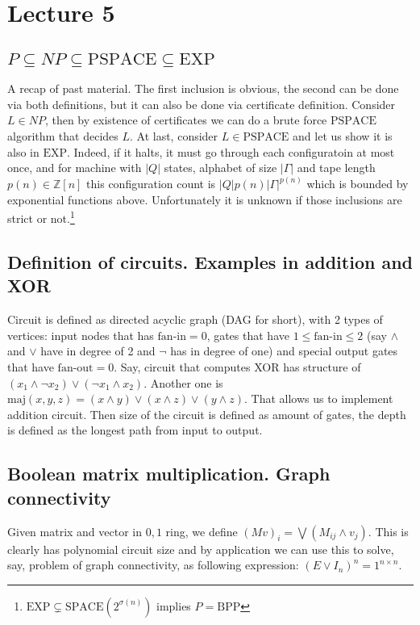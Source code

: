\documentclass[12pt]{article}
\begin{document}
\section{Lecture 5}
\subsection{\(P\subseteq NP\subseteq \text{PSPACE}\subseteq \text{EXP}\)}
A recap of past material. The first inclusion is obvious, the second can be done via both definitions, but it can also be done via certificate definition. Consider \(L\in NP\), then by existence of certificates we can do a brute force \(\text{PSPACE}\) algorithm that decides \(L\). At last, consider \(L\in\text{PSPACE}\) and let us show it is also in \(\text{EXP}\). Indeed, if it halts, it must go through each configuratoin at most once, and for machine with \(|Q|\) states, alphabet of size \(|\Gamma|\) and tape length \(p(n)\in\mathbb Z[n]\) this configuration count is \(|Q| p(n) |\Gamma|^{p(n)}\) which is bounded by exponential functions above. Unfortunately it is unknown if those inclusions are strict or not.\footnote{\(\text{EXP}\subsetneq \text{SPACE}(2^{\sigma(n)})\) implies \(P=\text{BPP}\)} 
\subsection{Definition of circuits. Examples in addition and XOR}
Circuit is defined as directed acyclic graph (DAG for short), with 2 types of vertices: input nodes that has \(\text{fan-in}=0\), gates that have \(1\leq\text{fan-in}\leq 2\) (say \(\land\) and \(\lor\) have in degree of 2 and \(\neg\) has in degree of one) and special output gates that have \(\text{fan-out}=0\).
Say, circuit that computes XOR has structure of \((x_1\land \neg x_2)\lor (\neg x_1\land x_2)\). Another one is \(\text{maj}(x,y,z)=(x\land y)\lor (x\land z)\lor (y\land z)\). That allows us to implement addition circuit.
Then size of the circuit is defined as amount of gates, the depth is defined as the longest path from input to output.


\subsection{Boolean matrix multiplication. Graph connectivity}
Given matrix and vector in \({0,1}\) ring, we define \((Mv)_i = \bigvee (M_{ij}\land v_j)\). This is clearly has polynomial circuit size and by application we can use this to solve, say, problem of graph connectivity, as following expression: \((E\lor I_n)^n = 1^{n\times n}\).
\end{document}

